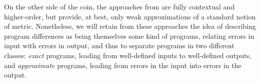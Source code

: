  
On the other side of the coin, the approaches from \cite{chaudhuri, dallago:differential-stlc} are fully contextual and higher-order, but provide, at best, only weak approximations of a standard notion of metric.  
 Nonetheless, we will retain from these approaches  the idea  of describing program differences as being themselves some kind of programs, relating errors in input with errors in  output, and thus to separate programs in two different classes: \emph{exact} programs, leading from well-defined inputs to well-defined outputs, and \emph{approximate} programs, leading from errors in the input into errors in the output.
%

%
%
%
%
%
%
%



